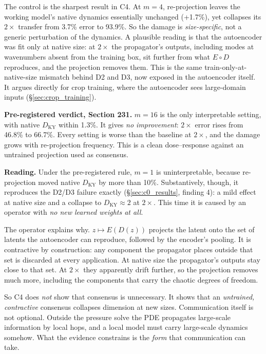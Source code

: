 \documentclass[11pt]{article}
\begin{document}
The control is the sharpest result in C4. At $m{=}4$, re-projection leaves
the working model's native dynamics essentially unchanged (+1.7\%), yet
collapses its $2\times$ transfer from 3.7\% error to 93.9\%. So the
damage is \emph{size-specific}, not a generic perturbation of the
dynamics. A plausible reading is that the autoencoder was fit only at
native size: at $2\times$ the propagator's outputs, including modes at
wavenumbers absent from the training box, sit further from what $E\circ D$
reproduces, and the projection removes them. This is the same
train-only-at-native-size mismatch behind D2 and D3, now exposed in the
autoencoder itself. It argues directly for crop training, where the
autoencoder sees large-domain inputs (\S\ref{sec:crop_training}).

\textbf{Pre-registered verdict, Section 231.} $m{=}16$ is the only
interpretable setting, with native $D_{\mathrm{KY}}$ within 1.3\%. It
gives \emph{no improvement}: $2\times$ error rises from 46.8\% to
66.7\%. Every setting is worse than the baseline at $2\times$, and the
damage grows with re-projection frequency. This is a clean dose--response
against an untrained projection used as consensus.

\textbf{Reading.} Under the pre-registered rule, $m{=}1$ is
uninterpretable, because re-projection moved native $D_{\mathrm{KY}}$ by
more than 10\%. Substantively, though, it reproduces the D2/D3 failure
exactly (\S\ref{sec:c0_results}, finding 4): a mild effect at native size
and a collapse to $D_{\mathrm{KY}}\approx2$ at $2\times$. This time it is
caused by an operator with \emph{no new learned weights at all}.

The operator explains why. $z\mapsto E(D(z))$ projects the latent onto
the set of latents the autoencoder can reproduce, followed by the
encoder's pooling. It is contractive by construction: any component the
propagator places outside that set is discarded at every application.
At native size the propagator's outputs stay close to that set. At
$2\times$ they apparently drift further, so the projection removes much
more, including the components that carry the chaotic degrees of
freedom.

So C4 does \emph{not} show that consensus is unnecessary. It shows that an
\emph{untrained, contractive} consensus collapses dimension at new sizes.
Communication itself is not optional. Outside the pressure solve the PDE
propagates large-scale information by local hops, and a local model must
carry large-scale dynamics somehow. What the evidence constrains is the
\emph{form} that communication can take.
\end{document}
